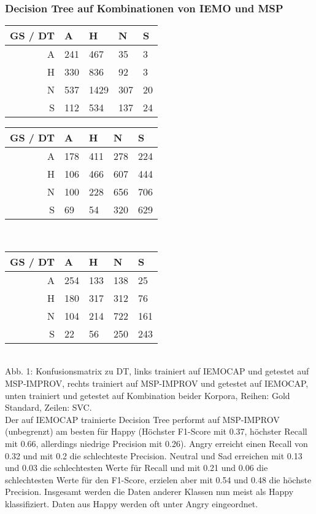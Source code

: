 \documentclass{article} %
\begin{document}
\subsubsection{Decision Tree auf Kombinationen von IEMO und MSP}
\begin{tabular}{|r|llll|}
\hline
GS / DT & A & H & N & S \\
\hline
A & 241 & 467 & 35 & 3 \\
H & 330 & 836 & 92 & 3 \\
N & 537 & 1429 & 307 & 20 \\
S & 112 & 534 & 137 & 24 \\
\hline
\end{tabular}
\begin{tabular}{|r|llll|}
\hline
GS / DT & A & H & N & S \\
\hline
A & 178 & 411 & 278 & 224 \\
H & 106 & 466 & 607 & 444 \\
N & 100 & 228 & 656 & 706 \\
S & 69 & 54 & 320 & 629 \\
\hline
\end{tabular} \\
\begin{tabular}{|r|llll|}
\hline
GS / DT & A & H & N & S \\
\hline
A & 254 & 133 & 138 & 25 \\
H & 180 & 317 & 312 & 76 \\
N & 104 & 214 & 722 & 161 \\
S & 22 & 56 & 250 & 243 \\
\hline
\end{tabular} \\

Abb. 1: Konfusionsmatrix zu DT, links trainiert auf IEMOCAP und getestet auf MSP-IMPROV, rechts trainiert auf MSP-IMPROV und getestet auf IEMOCAP, unten trainiert und getestet auf Kombination beider Korpora, Reihen: Gold Standard, Zeilen: SVC. \\
Der auf IEMOCAP trainierte Decision Tree performt auf MSP-IMPROV (unbegrenzt) am besten für Happy (Höchster F1-Score mit 0.37, höchster Recall mit 0.66, allerdings niedrige Precision mit 0.26). Angry erreicht einen Recall von 0.32 und mit 0.2 die schlechteste Precision. Neutral und Sad erreichen mit 0.13 und 0.03 die schlechtesten Werte für Recall und mit 0.21 und 0.06 die schlechtesten Werte für den F1-Score, erzielen aber mit 0.54 und 0.48 die höchste Precision. 
Insgesamt werden die Daten anderer Klassen nun meist als Happy klassifiziert. Daten aus Happy werden oft unter Angry eingeordnet. 
\end{document}
